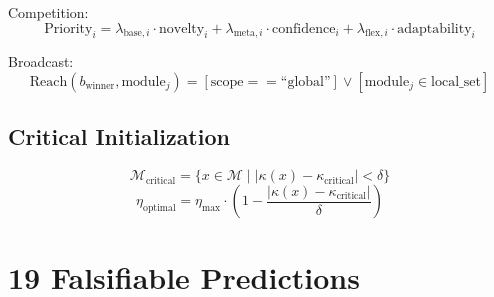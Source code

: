 \documentclass[11pt,a4paper]{article}
\theoremstyle{definition}
\theoremstyle{remark}
\newcommand{\M}{\mathcal{M}}
\begin{document}
Competition:
\begin{equation}
\text{Priority}_i = \lambda_{\text{base},i} \cdot \text{novelty}_i + \lambda_{\text{meta},i} \cdot \text{confidence}_i + \lambda_{\text{flex},i} \cdot \text{adaptability}_i
\end{equation}

Broadcast:
\begin{equation}
\text{Reach}(b_{\text{winner}}, \text{module}_j) = [\text{scope} == \text{``global''}] \lor [\text{module}_j \in \text{local\_set}]
\end{equation}

\subsection{Critical Initialization}\label{app:critical}
\begin{equation}
\M_{\text{critical}} = \{x \in \M \mid |\kappa(x) - \kappa_{\text{critical}}| < \delta\}
\end{equation}
\begin{equation}
\eta_{\text{optimal}} = \eta_{\text{max}} \cdot \left(1 - \frac{|\kappa(x) - \kappa_{\text{critical}}|}{\delta}\right)
\end{equation}

\newpage
\section{19 Falsifiable Predictions}\label{app:predictions}
\end{document}
